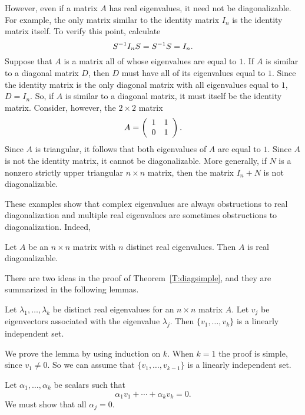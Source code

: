 However, even if a matrix $A$ has real eigenvalues, it need not
be diagonalizable.  For example, the only matrix similar to the
identity matrix $I_n$ is the identity matrix itself.  To verify
this point, calculate
\[
S^{-1} I_n S = S^{-1} S = I_n.
\]
Suppose that $A$ is a matrix all of whose eigenvalues are equal
to $1$.  If $A$ is similar to a diagonal matrix $D$, then $D$
must have all of its eigenvalues equal to $1$.  Since the
identity matrix is the only diagonal matrix with all eigenvalues
equal to $1$, $D=I_n$.  So, if $A$ is similar to a diagonal
matrix, it must itself be the identity matrix.  Consider,
however, the $2\times 2$ matrix
\[
A=\left(\begin{array}{rr} 1 & 1\\ 0 &1\end{array}\right).
\]
Since $A$ is triangular, it follows that both eigenvalues of $A$
are equal to $1$.  Since $A$ is not the identity matrix, it
cannot be diagonalizable. More generally, if $N$ is a nonzero
strictly upper triangular $n\times n$ matrix, then the matrix
$I_n+N$ is not diagonalizable.  

These examples show that complex eigenvalues are always
obstructions to real diagonalization and multiple real eigenvalues
are sometimes obstructions to diagonalization.  Indeed, 

\begin{thm}  \label{T:diagsimple}
Let $A$ be an $n\times n$ matrix with $n$ distinct real
eigenvalues.  
Then $A$ is real diagonalizable.
\end{thm}  

There are two ideas in the proof of Theorem~\ref{T:diagsimple}, and 
they are summarized in the following lemmas.

\begin{lemma} \label{L:simpleeigen}
Let $\lambda_1,\ldots,\lambda_k$ be distinct real eigenvalues
for an $n\times n$ matrix $A$.  Let $v_j$ be eigenvectors
associated with the eigenvalue $\lambda_j$.  Then
$\{v_1,\ldots,v_k\}$ is a linearly independent set.
\end {lemma} 

\proof We prove the lemma by using induction on $k$.  When $k=1$
the proof is simple, since $v_1\neq 0$.  So we can assume that
$\{v_1,\ldots,v_{k-1}\}$ is a linearly independent set. 

Let $\alpha_1,\ldots,\alpha_k$ be scalars such that
\begin{equation}  \label{e:linindep}
\alpha_1 v_1 + \cdots + \alpha_k v_k = 0.
\end{equation}
We must show that all $\alpha_j=0$.

